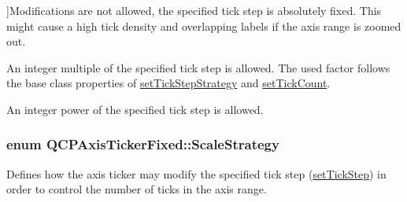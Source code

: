 \begin{Desc}
\begin{description}
{}]Modifications are not allowed, the specified tick step is absolutely fixed. This might cause a high tick density and overlapping labels if the axis range is zoomed out. \item[{\em 
ss\+Multiples\hypertarget{class_q_c_p_axis_ticker_fixed_a15b3d38b935d404b1311eb85cfb6a439a410f5c537f577b9dda33cb0152b756c6}{}\label{class_q_c_p_axis_ticker_fixed_a15b3d38b935d404b1311eb85cfb6a439a410f5c537f577b9dda33cb0152b756c6}
}]An integer multiple of the specified tick step is allowed. The used factor follows the base class properties of \hyperlink{class_q_c_p_axis_ticker_a73b1d847c1a12159af6bfda4ebebe7d5}{set\+Tick\+Step\+Strategy} and \hyperlink{class_q_c_p_axis_ticker_a47752abba8293e6dc18491501ae34008}{set\+Tick\+Count}. \item[{\em 
ss\+Powers\hypertarget{class_q_c_p_axis_ticker_fixed_a15b3d38b935d404b1311eb85cfb6a439ab965e069729e3426a0b18c54a5ac6afd}{}\label{class_q_c_p_axis_ticker_fixed_a15b3d38b935d404b1311eb85cfb6a439ab965e069729e3426a0b18c54a5ac6afd}
}]An integer power of the specified tick step is allowed. \end{description}
\end{Desc}
\subsubsection[{\texorpdfstring{Scale\+Strategy}{ScaleStrategy}}]{\setlength{\rightskip}{0pt plus 5cm}enum {\bf Q\+C\+P\+Axis\+Ticker\+Fixed\+::\+Scale\+Strategy}}\hypertarget{class_q_c_p_axis_ticker_fixed_a15b3d38b935d404b1311eb85cfb6a439}{}\label{class_q_c_p_axis_ticker_fixed_a15b3d38b935d404b1311eb85cfb6a439}
Defines how the axis ticker may modify the specified tick step (\hyperlink{class_q_c_p_axis_ticker_fixed_a4bc83d85a4f81d4abdd3fa5042d7b833}{set\+Tick\+Step}) in order to control the number of ticks in the axis range.

